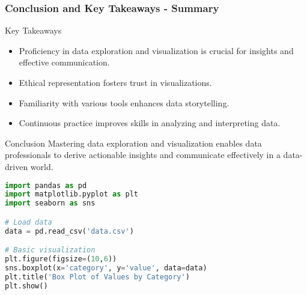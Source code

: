 \documentclass[aspectratio=169]{beamer}
\begin{document}
\begin{frame}[fragile]
    \frametitle{Conclusion and Key Takeaways - Summary}
    \begin{block}{Key Takeaways}
        \begin{itemize}
            \item Proficiency in data exploration and visualization is crucial for insights and effective communication.
            \item Ethical representation fosters trust in visualizations.
            \item Familiarity with various tools enhances data storytelling.
            \item Continuous practice improves skills in analyzing and interpreting data.
        \end{itemize}
    \end{block}

    \begin{block}{Conclusion}
        Mastering data exploration and visualization enables data professionals to derive actionable insights and communicate effectively in a data-driven world.
    \end{block}

    \begin{lstlisting}[language=Python]
import pandas as pd
import matplotlib.pyplot as plt
import seaborn as sns

# Load data
data = pd.read_csv('data.csv')

# Basic visualization
plt.figure(figsize=(10,6))
sns.boxplot(x='category', y='value', data=data)
plt.title('Box Plot of Values by Category')
plt.show()
    \end{lstlisting}
\end{frame}
\end{document}
